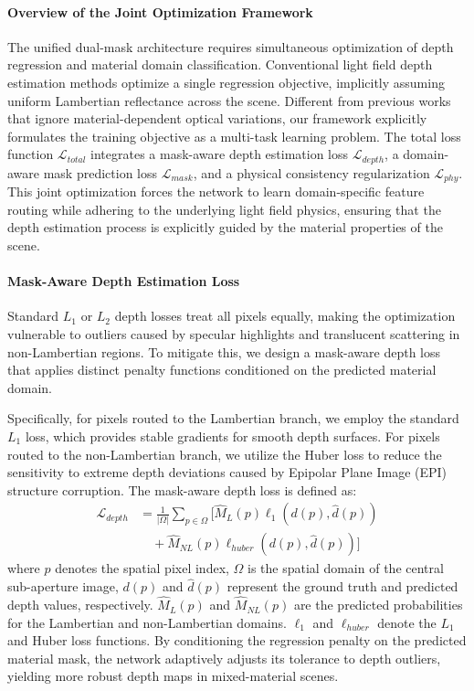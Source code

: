 \documentclass[lettersize,journal]{IEEEtran}
\begin{document}
\paragraph{Overview of the Joint Optimization Framework}
The unified dual-mask architecture requires simultaneous optimization of depth regression and material domain classification. Conventional light field depth estimation methods optimize a single regression objective, implicitly assuming uniform Lambertian reflectance across the scene. Different from previous works that ignore material-dependent optical variations, our framework explicitly formulates the training objective as a multi-task learning problem. The total loss function $\mathcal{L}_{total}$ integrates a mask-aware depth estimation loss $\mathcal{L}_{depth}$, a domain-aware mask prediction loss $\mathcal{L}_{mask}$, and a physical consistency regularization $\mathcal{L}_{phy}$. This joint optimization forces the network to learn domain-specific feature routing while adhering to the underlying light field physics, ensuring that the depth estimation process is explicitly guided by the material properties of the scene.

\paragraph{Mask-Aware Depth Estimation Loss}
Standard $L_1$ or $L_2$ depth losses treat all pixels equally, making the optimization vulnerable to outliers caused by specular highlights and translucent scattering in non-Lambertian regions. To mitigate this, we design a mask-aware depth loss that applies distinct penalty functions conditioned on the predicted material domain. 

Specifically, for pixels routed to the Lambertian branch, we employ the standard $L_1$ loss, which provides stable gradients for smooth depth surfaces. For pixels routed to the non-Lambertian branch, we utilize the Huber loss to reduce the sensitivity to extreme depth deviations caused by Epipolar Plane Image (EPI) structure corruption. The mask-aware depth loss is defined as:
\begin{equation}
\begin{aligned}
\mathcal{L}_{depth} &= \frac{1}{|\Omega|} \sum_{p \in \Omega} \Big[ \hat{M}_L(p) \ell_1(d(p), \hat{d}(p)) \\
&\quad + \hat{M}_{NL}(p) \ell_{huber}(d(p), \hat{d}(p)) \Big]
\end{aligned}
\end{equation}
where $p$ denotes the spatial pixel index, $\Omega$ is the spatial domain of the central sub-aperture image, $d(p)$ and $\hat{d}(p)$ represent the ground truth and predicted depth values, respectively. $\hat{M}_L(p)$ and $\hat{M}_{NL}(p)$ are the predicted probabilities for the Lambertian and non-Lambertian domains. $\ell_1$ and $\ell_{huber}$ denote the $L_1$ and Huber loss functions. By conditioning the regression penalty on the predicted material mask, the network adaptively adjusts its tolerance to depth outliers, yielding more robust depth maps in mixed-material scenes.
\end{document}
